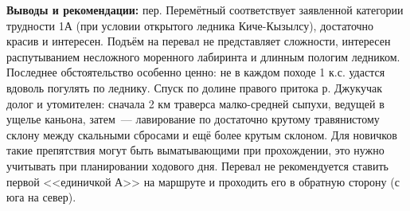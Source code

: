 \textbf{Выводы и рекомендации:} пер. Перемётный соответствует заявленной категории трудности 1А (при условии открытого ледника Киче-Кызылсу), достаточно красив и интересен. Подъём на перевал не представляет сложности, интересен распутыванием несложного моренного лабиринта и длинным пологим ледником. Последнее обстоятельство особенно ценно: не в каждом походе 1 к.с. удастся вдоволь погулять по леднику. Спуск по долине правого притока р. Джукучак долог и утомителен: сначала 2 км траверса малко-средней сыпухи, ведущей в ущелье каньона, затем~--- лавирование по достаточно крутому травянистому склону между скальными сбросами и ещё более крутым склоном. Для новичков такие препятствия могут быть выматывающими при прохождении, это нужно учитывать при планировании ходового дня. Перевал не рекомендуется ставить первой <<единичкой А>> на маршруте и проходить его в обратную сторону (с юга на север). 

\clearpage